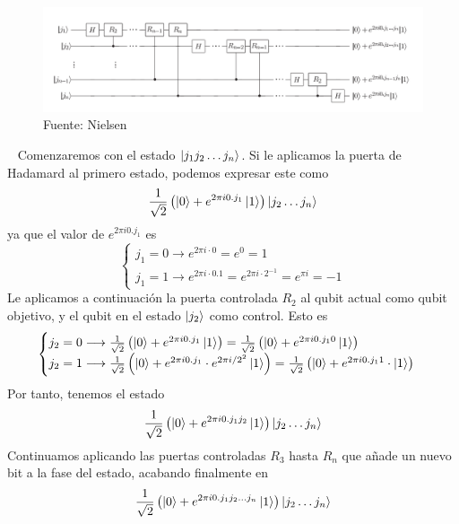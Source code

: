 \documentclass[a4paper]{article}
\numberwithin{equation}{section}
\begin{document}
\begin{figure}[h] \label{fig_qft}
\centering
\includegraphics[scale=0.65]{qft}
\caption{Fuente: Nielsen \cite{nielsen2001quantum}}
\end{figure}\ \linebreak
Comenzaremos con el estado $\ket{j_1 j_2 \ldots j_n}$. Si le aplicamos la puerta de Hadamard al primero estado, podemos expresar este como
\begin{equation}
\frac{1}{\sqrt{2}}\left( \ket{0} + e^{2\pi i 0.j_1}\ket{1} \right)
\ket{j_2 \ldots j_n}
\end{equation}
ya que el valor de $e^{2\pi i 0.j_1}$ es
\begin{equation}
\begin{cases}
j_1 = 0 \longrightarrow e^{2\pi i \cdot 0} = e^0 = 1 \\
j_1 = 1 \longrightarrow e^{2\pi i \cdot 0.\text{1}} = e^{2\pi i \cdot 2^{-1}} = e^{\pi i} = -1
\end{cases}
\end{equation}
Le aplicamos a continuación la puerta controlada $R_2$ al qubit actual como qubit objetivo, y el qubit en el estado $\ket{j_2}$ como control.
Esto es
\begin{equation}
\begin{cases}
j_2 = 0 \longrightarrow \frac{1}{\sqrt{2}}\left( \ket{0} + e^{2\pi i 0.j_1} \ket{1} \right)
=
\frac{1}{\sqrt{2}}\left( \ket{0} + e^{2\pi i 0.j_1 0} \ket{1} \right) \\
j_2 = 1 \longrightarrow
\frac{1}{\sqrt{2}}\left( \ket{0} + e^{2\pi i 0.j_1}\cdot e^{2\pi i/2^2} \ket{1} \right)
=
\frac{1}{\sqrt{2}}\left( \ket{0} + e^{2\pi i 0.j_1 1}\cdot \ket{1} \right)
\end{cases}
\end{equation}
Por tanto, tenemos el estado
\begin{equation}
\frac{1}{\sqrt{2}}\left( \ket{0} + e^{2\pi i 0.j_1 j_2}\ket{1} \right)
\ket{j_2 \ldots j_n}
\end{equation}
Continuamos aplicando las puertas controladas $R_3$ hasta $R_n$ que añade un nuevo bit a la fase del estado, acabando finalmente en
\begin{equation}
\frac{1}{\sqrt{2}}\left( \ket{0} + e^{2\pi i 0.j_1 j_2\ldots j_n}\ket{1} \right)
\ket{j_2 \ldots j_n}
\end{equation}
\end{document}
